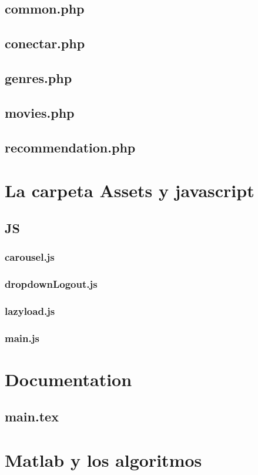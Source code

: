 \documentclass[a4paper, 12pt]{report}
\begin{document}
    \section{common.php}
    \section{conectar.php}
    \section{genres.php}
    \section{movies.php}
    \section{recommendation.php}

    \chapter{La carpeta Assets y javascript}
      \section{JS}
      \subsection{carousel.js}
      \subsection{dropdownLogout.js}
      \subsection{lazyload.js}
      \subsection{main.js}
    \chapter{Documentation}
      \section{main.tex}

    \chapter{Matlab y los algoritmos}
\end{document}
